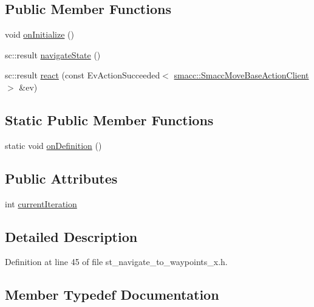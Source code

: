 \subsection*{Public Member Functions}
\begin{DoxyCompactItemize}
\item 
void \hyperlink{structsm__dance__bot_1_1StNavigateToWaypointsX_a5954a62667839c5b56ff07ebd26541d7}{on\+Initialize} ()
\item 
sc\+::result \hyperlink{structsm__dance__bot_1_1StNavigateToWaypointsX_a453c27db2a9318c65fe0f4a5abbadf3a}{navigate\+State} ()
\item 
sc\+::result \hyperlink{structsm__dance__bot_1_1StNavigateToWaypointsX_abaa719355ecb0fc748c136c723d3b343}{react} (const Ev\+Action\+Succeeded$<$ \hyperlink{classsmacc_1_1SmaccMoveBaseActionClient}{smacc\+::\+Smacc\+Move\+Base\+Action\+Client} $>$ \&ev)
\end{DoxyCompactItemize}
\subsection*{Static Public Member Functions}
\begin{DoxyCompactItemize}
\item 
static void \hyperlink{structsm__dance__bot_1_1StNavigateToWaypointsX_abfa4eb3045794e95b79852f0c328b03e}{on\+Definition} ()
\end{DoxyCompactItemize}
\subsection*{Public Attributes}
\begin{DoxyCompactItemize}
\item 
int \hyperlink{structsm__dance__bot_1_1StNavigateToWaypointsX_ac282dc1978f30ad53499dbfddd80ecdc}{current\+Iteration}
\end{DoxyCompactItemize}


\subsection{Detailed Description}


Definition at line 45 of file st\+\_\+navigate\+\_\+to\+\_\+waypoints\+\_\+x.\+h.



\subsection{Member Typedef Documentation}
